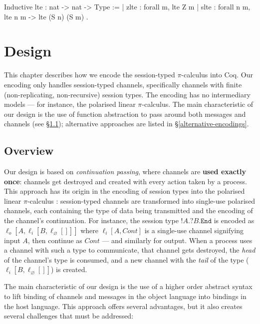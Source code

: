 \documentclass{mproj}
\newcommand{\picalc}{$\pi$-calculus}
\newcommand{\type}{\texttt}
\newcommand{\End}{\type{End}}
\newcommand{\Send}[1]{!#1.}
\newcommand{\Recv}[1]{?#1.}
\renewcommand{\emptyset}{\varnothing}
\begin{document}
\begin{coq}
    Inductive lte : nat -> nat -> Type :=
    | zlte : forall {m}, lte Z m
    | slte : forall {n m}, lte n m -> lte (S n) (S m)
    .
\end{coq}

\chapter{Design}\label{design}

This chapter describes how we encode the session-typed \picalc{} into Coq. Our encoding only handles session-typed channels, specifically channels with finite (non-replicating, non-recursive) session types. The encoding has no intermediary models --- for instance, the polarised linear \picalc{}. The main characteristic of our design is the use of function abstraction to pass around both messages and channels (see \S \ref{overview}); alternative approaches are listed in \S \ref{alternative-encodings}. 

\section{Overview}\label{overview}

Our design is based on \emph{continuation passing}, where channels are \textbf{used exactly once}: channels get destroyed and created with every action taken by a process. This approach has its origin in the encoding of session types into the polarised linear \picalc{} \cite{Kobayashi1999, Dardha2012, Dardha2016}: session-typed channels are transformed into single-use polarised channels, each containing the type of data being transmitted and the encoding of the channel's continuation. For instance, the session type $\Send{A} \Recv{B} \End$ is encoded as $\ell_o [A,\ell_i [B,\ell_\emptyset []]]$ where $\ell_i [A, Cont]$ is a single-use channel signifying input $A$, then continue as $Cont$ --- and similarly for output. When a process uses a channel with such a type to communicate, that channel gets destroyed, the \emph{head} of the channel's type is consumed, and a new channel with the \emph{tail} of the type ($\ell_i [B, \ell_\emptyset []]$) is created.

The main characteristic of our design is the use of a higher order abstract syntax to lift binding of channels and messages in the object language into bindings in the host language. This approach offers several advantages, but it also creates several challenges that must be addressed:
\end{document}
